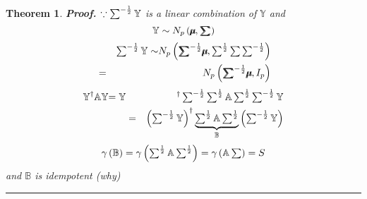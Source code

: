 \documentclass{article}
\newtheorem{theorem}{Theorem}
\newenvironment{proof}[1][Proof]{\noindent\textbf{#1.} }{\ \rule{0.5em}{0.5em}}
\begin{document}
\begin{theorem}
\begin{proof}
$\because \mathop{\textstyle \sum }\nolimits^{-\frac{1}{2}}\mathbb{Y}$ is a linear combination
of $\mathbb{Y}$ and 
\begin{equation*}
\mathbb{Y}\sim N_{p}\left( \mathbb{%
\mu\mkern-12.3mu\mu%
},\mathbb{%
\tsum\mkern-20mu\tsum%
}\right)
\end{equation*}%
\begin{eqnarray*}
&\therefore &\tsum\nolimits^{-\frac{1}{2}}\mathbb{Y\sim }N_{p}\left( \mathbb{%
\tsum\mkern-20mu\tsum%
}^{-\frac{1}{2}}\mathbb{%
\mu\mkern-12.3mu\mu%
},\tsum\nolimits^{\frac{1}{2}}\tsum \tsum\nolimits^{-\frac{1}{2}}\right) \\
&=&N_{p}\left( \mathbb{%
\tsum\mkern-20mu\tsum%
}^{-\frac{1}{2}}\mathbb{%
\mu\mkern-12.3mu\mu%
},I_{p}\right)
\end{eqnarray*}%
\begin{eqnarray*}
\mathbb{Y}^{\mathbb{\dagger }}\mathbb{AY}\mathbb{=Y} &&^{\mathbb{\dagger }%
}\tsum\nolimits^{-\frac{1}{2}}\tsum\nolimits^{\frac{1}{2}}\mathbb{A}%
\tsum\nolimits^{\frac{1}{2}}\tsum\nolimits^{-\frac{1}{2}}\mathbb{Y} \\
&=&\left( \tsum\nolimits^{-\frac{1}{2}}\mathbb{Y}\right) ^{\dagger }\underset%
{\mathbb{B}}{\underbrace{\tsum\nolimits^{\frac{1}{2}}\mathbb{A}%
\tsum\nolimits^{\frac{1}{2}}}}\left( \tsum\nolimits^{-\frac{1}{2}}\mathbb{Y}%
\right)
\end{eqnarray*}%
\begin{equation*}
\gamma \left( \mathbb{B}\right) =\gamma \left( \tsum\nolimits^{\frac{1}{2}}%
\mathbb{A}\tsum\nolimits^{\frac{1}{2}}\right) =\gamma \left( \mathbb{A}\tsum
\right) =S
\end{equation*}%
and $\mathbb{B}$ is idempotent (why)
\end{proof}
\end{theorem}

\bigskip
\end{document}
